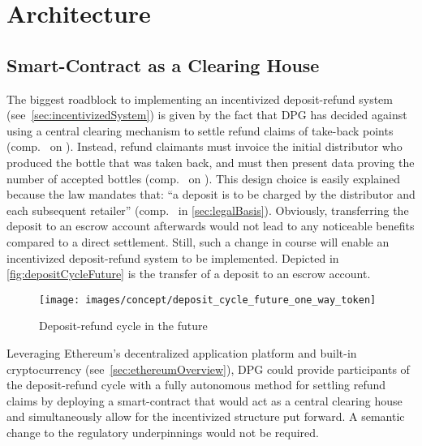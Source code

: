 	
\pagebreak

\section{Architecture}
\subsection{Smart-Contract as a Clearing House}
\label{sec:centralClearingHouse}
The biggest roadblock to implementing an incentivized deposit-refund system (see~\ref{sec:incentivizedSystem}) is given by the fact that \ac{DPG} has decided against using a central clearing mechanism to settle refund claims of take-back points (comp.~ on ). Instead, refund claimants must invoice the initial distributor who produced the bottle that was taken back, and must then present data proving the number of accepted bottles (comp.~ on ). This design choice is easily explained because the law mandates that: \enquote{a deposit is to be charged by the distributor and each subsequent retailer} (comp.~ in \ref{sec:legalBasis}). Obviously, transferring the deposit to an escrow account afterwards would not lead to any noticeable benefits compared to a direct settlement. Still, such a change in course will enable an incentivized deposit-refund system to be implemented. Depicted in \autoref{fig:depositCycleFuture} is the transfer of a deposit to an escrow account.

\begin{figure}[hbt]
	  \texttt{[image: images/concept/deposit\_cycle\_future\_one\_way\_token]}
	  \caption[Deposit-refund cycle in the future]{Deposit-refund cycle in the future \footnotemark}
	  \label{fig:depositCycleFuture}
\end{figure}


\FloatBarrier

Leveraging Ethereum's decentralized application platform and built-in cryptocurrency (see~\ref{sec:ethereumOverview}), \ac{DPG} could provide participants of the deposit-refund cycle with a fully autonomous method for settling refund claims by deploying a smart-contract that would act as a central clearing house and simultaneously allow for the incentivized structure put forward. A semantic change to the regulatory underpinnings would not be required. 

